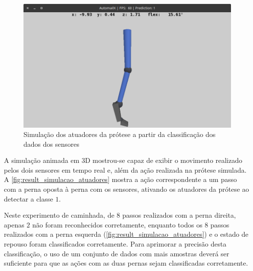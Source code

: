 \begin{figure}[ht]
	\caption{\label{fig:result_simulacao_atuadores}Simulação dos atuadores da prótese a partir da classificação dos dados dos sensores}
	\begin{center}
		\includegraphics[width=\textwidth]{resources/result_simulacao_atuadores}
	\end{center}
\end{figure}

A simulação animada em 3D mostrou-se capaz de exibir o movimento realizado pelos dois sensores em tempo real e, além da ação realizada na prótese simulada. A \autoref{fig:result_simulacao_atuadores} mostra a ação correspondente a um passo com a perna oposta à perna com os sensores, ativando os atuadores da prótese ao detectar a classe \(1\).

Neste experimento de caminhada, de \(8\) passos realizados com a perna direita, apenas \(2\) não foram reconhecidos corretamente, enquanto todos os \(8\) passos realizados com a perna esquerda (\autoref{fig:result_simulacao_atuadores}) e o estado de repouso foram classificados corretamente. Para aprimorar a precisão desta classificação, o uso de um conjunto de dados com mais amostras deverá ser suficiente para que as ações com as duas pernas sejam classificadas corretamente.